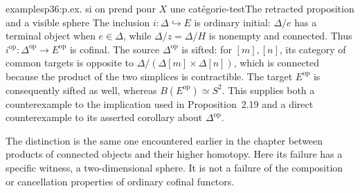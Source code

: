 \begin{dcomment}{examples}{p36:p.ex. si on prend pour $X$ une catégorie-test}{The retracted proposition and a visible sphere}
The inclusion $i:\Delta\hookrightarrow E$ is ordinary initial: $\Delta/e$ has a terminal object when $e\in\Delta$, while $\Delta/z=\Delta/H$ is nonempty and connected. Thus $i^{\mathrm{op}}:\Delta^{\mathrm{op}}\longrightarrow E^{\mathrm{op}}$ is cofinal. The source $\Delta^{\mathrm{op}}$ is sifted: for $[m],[n]$, its category of common targets is opposite to $\Delta/(\Delta[m]\times\Delta[n])$, which is connected because the product of the two simplices is contractible. The target $E^{\mathrm{op}}$ is consequently sifted as well, whereas $B(E^{\mathrm{op}})\simeq S^2$. This supplies both a counterexample to the implication used in Proposition~2.19 and a direct counterexample to its asserted corollary about $\Delta^{\mathrm{op}}$.

The distinction is the same one encountered earlier in the chapter between products of connected objects and their higher homotopy. Here its failure has a specific witness, a two-dimensional sphere. It is not a failure of the composition or cancellation properties of ordinary cofinal functors.
\end{dcomment}

